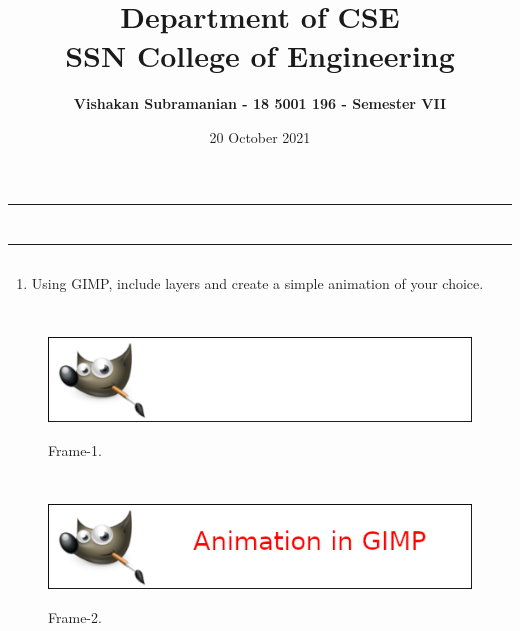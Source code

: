 \documentclass[12pt, a4]{article}
\title{\textbf{Department of CSE\\SSN College of Engineering}}
\author{\textbf{Vishakan Subramanian - 18 5001 196 - Semester VII}}
\date{20 October 2021}
\begin{document}
\maketitle
\hrule
\section*{}
\hrule
\bigskip

\subsection*{}
\subsection*{}
\begin{flushleft}

\begin{enumerate}

\item Using GIMP, include layers and create a simple animation of your choice. 

\end{enumerate}
 
\end{flushleft}


\newpage
\subsection*{}
\begin{figure}[h]
\centering
\caption{Frame-1.}
\includegraphics[height=3cm, width=12cm]{Frame-1.png}
\end{figure}

\subsection*{}
\begin{figure}[h]
\centering
\caption{Frame-2.}
\includegraphics[height=3cm, width=12cm]{Frame-2.png}
\end{figure}
\end{document}
